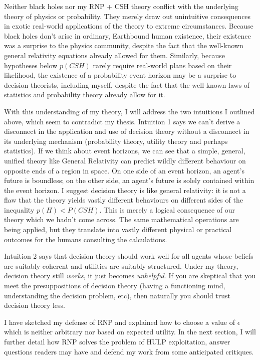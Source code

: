 \documentclass{article}
\begin{document}
Neither black holes nor my RNP + CSH theory conflict with the underlying theory of physics or probability. They merely draw out unintuitive consequences in exotic real-world applications of the theory to extreme circumstances. Because black holes don't arise in ordinary, Earthbound human existence, their existence was a surprise to the physics community, despite the fact that the well-known general relativity equations already allowed for them. Similarly, because hypotheses below \(p(CSH)\) rarely require real-world plans based on their likelihood, the existence of a probability event horizon may be a surprise to decision theorists, including myself, despite the fact that the well-known laws of statistics and probability theory already allow for it.

With this understanding of my theory, I will address the two intuitions I outlined above, which seem to contradict my thesis. Intuition 1 says we can't derive a disconnect in the application and use of decision theory without a disconnect in its underlying mechanism (probability theory, utility theory and perhaps statistics). If we think about event horizons, we can see that a simple, general, unified theory like General Relativity can predict wildly different behaviour on opposite ends of a region in space. On one side of an event horizon, an agent's future is boundless; on the other side, an agent's future is solely contained within the event horizon. I suggest decision theory is like general relativity: it is not a flaw that the theory yields vastly different behaviours on different sides of the inequality \(p(H)<P(CSH)\). This is merely a logical consequence of our theory which we hadn't come across. The same mathematical operations are being applied, but they translate into vastly different physical or practical outcomes for the humans consulting the calculations.

Intuition 2 says that decision theory should work well for all agents whose beliefs are suitably coherent and utilities are suitably structured. Under my theory, decision theory still \textit{works}, it just becomes \textit{unhelpful}. If you are skeptical that you meet the presuppositions of decision theory (having a functioning mind, understanding the decision problem, etc), then naturally you should trust decision theory less.

I have sketched my defense of RNP and explained how to choose a value of \(\epsilon\) which is neither arbitrary nor based on expected utility. In the next section, I will further detail how RNP solves the problem of HULP exploitation, answer questions readers may have and defend my work from some anticipated critiques. 
\end{document}
